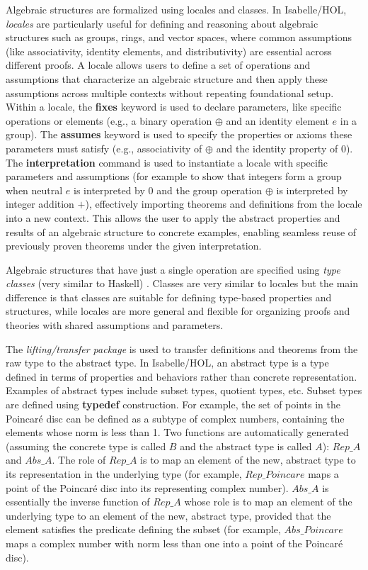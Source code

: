 \documentclass[a4paper]{article}
\theoremstyle{definition}
\begin{document}
Algebraic structures are formalized using
locales\cite{isabelle-locales} and classes\cite{isabelle-classes}. In
Isabelle/HOL, \emph{locales} are particularly useful for defining and
reasoning about algebraic structures such as groups, rings, and vector
spaces, where common assumptions (like associativity, identity
elements, and distributivity) are essential across different proofs. A
locale allows users to define a set of operations and assumptions that
characterize an algebraic structure and then apply these assumptions
across multiple contexts without repeating foundational setup. Within
a locale, the \textbf{fixes} keyword is used to declare parameters,
like specific operations or elements (e.g., a binary operation
$\oplus$ and an identity element $e$ in a group). The \textbf{assumes}
keyword is used to specify the properties or axioms these parameters
must satisfy (e.g., associativity of $\oplus$ and the identity
property of $0$). The \textbf{interpretation} command is used to
instantiate a locale with specific parameters and assumptions (for
example to show that integers form a group when neutral $e$ is
interpreted by $0$ and the group operation $\oplus$ is interpreted by
integer addition $+$), effectively importing theorems and definitions
from the locale into a new context. This allows the user to apply the
abstract properties and results of an algebraic structure to concrete
examples, enabling seamless reuse of previously proven theorems under
the given interpretation.

Algebraic structures that have just a single operation are specified
using \emph{type classes} (very similar to Haskell)
\cite{isabelle-classes}. Classes are very similar to locales but the
main difference is that classes are suitable for defining type-based
properties and structures, while locales are more general and flexible
for organizing proofs and theories with shared assumptions and
parameters.

The \emph{lifting/transfer package}\cite{isabelle-lifting-transfer} is
used to transfer definitions and theorems from the raw type to the
abstract type. In Isabelle/HOL, an abstract type is a type defined in
terms of properties and behaviors rather than concrete
representation. Examples of abstract types include subset types,
quotient types, etc. Subset types are defined using \textbf{typedef}
construction. For example, the set of points in the Poincar\'e disc
can be defined as a subtype of complex numbers, containing the
elements whose norm is less than 1. Two functions are automatically
generated (assuming the concrete type is called $B$ and the abstract
type is called $A$): $\mathit{Rep\_A}$ and $\mathit{Abs\_A}$. The role
of $\mathit{Rep\_A}$ is to map an element of the new, abstract type to
its representation in the underlying type (for example,
$\mathit{Rep\_Poincare}$ maps a point of the Poincar\'e disc into its
representing complex number). $\mathit{Abs\_A}$ is essentially the
inverse function of $\mathit{Rep\_A}$ whose role is to map an element
of the underlying type to an element of the new, abstract type,
provided that the element satisfies the predicate defining the subset
(for example, $\mathit{Abs\_Poincare}$ maps a complex number with norm
less than one into a point of the Poincar\'e disc).
\end{document}
